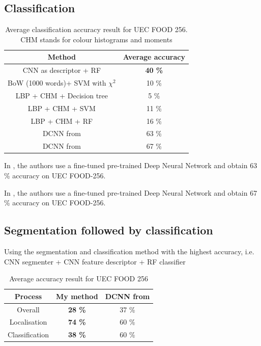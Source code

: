 \subsection{Classification}

\begin{table}
    \centering
    \renewcommand{\arraystretch}{1.2}
    \begin{tabulary}{\textwidth}{| c | C|}
        \hline
        Method & Average accuracy \\
        \hline
        CNN as descriptor + RF & \textbf{40 \%} \\ 
        \hline
        BoW (1000 words)+ SVM with $\chi^2$ & 10 \% \\ %
        \hline
        LBP + CHM + Decision tree & 5 \% \\ 
        \hline
        LBP + CHM + SVM & 11 \% \\ %
        \hline
        LBP + CHM + RF & 16 \% \\ %
        \hline
        DCNN from \cite{Bolanos2016} & 63 \%\\
        \hline 
        DCNN from \cite{Yanai2015} & 67 \%\\
        \hline 
    \end{tabulary}
    \caption[Average classification accuracy result for UEC FOOD 256]{Average classification accuracy result for UEC FOOD 256. CHM stands for colour histograms and moments}
\end{table}

In \cite{Bolanos2016}, the authors use a fine-tuned pre-trained Deep Neural Network and obtain 63 \% accuracy on UEC FOOD-256.

In \cite{Yanai2015}, the authors use a fine-tuned pre-trained Deep Neural Network and obtain 67 \% accuracy on UEC FOOD-256.


\subsection{Segmentation followed by classification}

Using the segmentation and classification method with the highest accuracy, i.e. CNN segmenter + CNN feature descriptor + RF classifier

\begin{table}
    \centering
    \renewcommand{\arraystretch}{1.2}
    \begin{tabulary}{\textwidth}{| c | C C|}
        \hline
        Process & My method & DCNN from \cite{Bolanos2016} \\
        \hline
        Overall & \textbf{28 \%} & 37 \% \\ 
        \hline
        Localisation &  \textbf{74 \%} & 60 \% \\
        \hline
        Classification &  \textbf{38 \%} & 60 \% \\
        \hline
    \end{tabulary}
    \caption{Average accuracy result for UEC FOOD 256}
\end{table}

